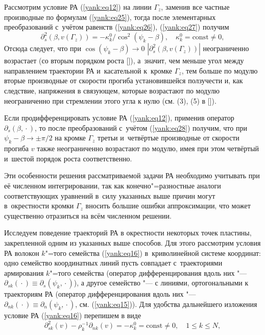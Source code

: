 Рассмотрим условие РА (\ref{yank:eq12}) на линии $\Gamma_z  $, заменив все частные производные по формулам (\ref{yank:eq25}), тогда после элементарных преобразований с~учётом равенств (\ref{yank:eq26}), (\ref{yank:eq27}) получим 
\begin{equation} \label{yank:eq28}
\partial_s ^2 (\beta, v(\Gamma_z ))=-\kappa_k ^0 /\cos^2 (\psi_k -\beta), \quad \kappa_k ^0 =\text{const}\neq0,
\end{equation}
Отсюда следует, что при $\cos(\psi_k -\beta)\to 0$ $|\partial_s ^2 (\beta, v(\Gamma_z ))|$ неограниченно возрастает
(со вторым порядком роста []), а~значит, чем меньше угол между направлением траектории РА и~касательной к~кромке $\Gamma_z $, тем больше по модулю вторые производные от скорости прогиба установившейся ползучести и, как следствие, напряжения в связующем, которые возрастают по модулю неограниченно при стремлении этого угла к нулю (см. (3), (5) в []).

Если продифференцировать условие РА (\ref{yank:eq12}), применив оператор \mbox{$\partial_s (\beta, {} \cdot {})$,} то после преобразований с~учётом (\ref{yank:eq28}) получим, что при $\psi_k -\beta \to \pm \pi/2$ на кромке $\Gamma_z $ третьи и~четвёртые производные от скорости прогиба $v$ также неограниченно возрастают по модулю, имея при этом четвёртый и~шестой порядок роста соответственно.

Эти особенности решения рассматриваемой задачи РА необходимо учитывать при её численном интегрировании, так как конечно"=разностные аналоги соответствующих уравнений в~силу указанных выше причин могут в~окрестности кромки $\Gamma_z $ вносить большие ошибки аппроксимации, что может существенно отразиться на всём численном решении.

Исследуем поведение траекторий РА в окрестности некоторых точек пластины, закрепленной одним из указанных выше способов. 
Для этого рассмотрим условия РА волокон $k$"=того семейства (\ref{yank:eq16}) в~криволинейной системе координат: одно семейство координатных линий пусть совпадает с~траекториями армирования $k$"=того семейства (оператор дифференцирования вдоль них "---
$\partial_{sk}({} \cdot {})\equiv\partial_{s}(\psi_k , {} \cdot {})$), а другое семейство "--- с линиями, ортогональными к траекториям РА (оператор дифференцирования вдоль них "--- $\partial_{nk}({} \cdot {})\equiv\partial_{n}(\psi_k , {} \cdot {})$, см. (\ref{yank:eq15})). Для удобства
дальнейшего изложения условие РА (\ref{yank:eq16}) перепишем в виде
\begin{equation} \label{yank:eq29}
\partial_{sk}^2 (v)-\rho_k ^{-1}\partial_{nk}(v)=-\kappa_k ^0 =\text{const}\neq0, \quad 1\leq k \leq N,
\end{equation}


